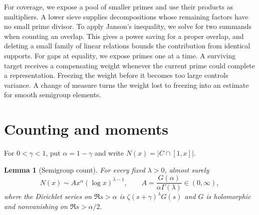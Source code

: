 \documentclass[11pt]{article}
\newtheorem{lemma}{Lemma}[section]
\begin{document}
For coverage, we expose a pool of smaller primes and use their
products as multipliers. A lower sieve supplies decompositions
whose remaining factors have no small prime divisor. To apply
Janson's inequality, we solve for two summands when counting an
overlap. This gives a power saving for a proper overlap, and
deleting a small family of linear relations bounds the contribution
from identical supports. For gaps at equality, we expose primes
one at a time. A surviving target receives a compensating weight
whenever the current prime could complete a representation.
Freezing the weight before it becomes too large controls variance.
A change of measure turns the weight lost to freezing into an
estimate for smooth semigroup elements.

\section{Counting and moments}\label{sec:count}

For \(0<\gamma<1\), put \(\alpha=1-\gamma\) and write
\(N(x)=|C\cap[1,x]|\).

\begin{lemma}[Semigroup count]\label{lem:count}
For every fixed \(\lambda>0\), almost surely
\begin{equation}\label{eq:count}
  N(x)\sim A x^\alpha(\log x)^{\lambda-1},
  \qquad
  A=\frac{G(\alpha)}{\alpha\Gamma(\lambda)}\in(0,\infty),
\end{equation}
where the Dirichlet series on \(\Re s>\alpha\) is
\(\zeta(s+\gamma)^\lambda G(s)\) and \(G\) is holomorphic and
nonvanishing on \(\Re s>\alpha/2\).
\end{lemma}
\end{document}
